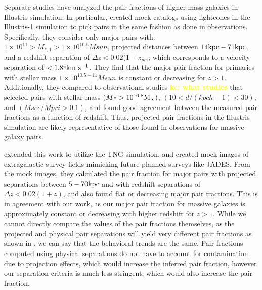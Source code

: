 \documentclass[twocolumn]{aastex631}
\newcommand{\kc}[1]{\textcolor{yellow}{\textbf{kc: #1}} }
\begin{document}
Separate studies have analyzed the pair fractions of higher mass galaxies in Illustris simulation. 
In particular, \citet{snyder2017} created mock catalogs using lightcones in the Illustris-1 simulation to pick pairs in the same fashion as done in observations. 
Specifically, they consider only major pairs with: $1\times 10^{11}>M_{*,1} >1\times 10^{10.5}Msun$, projected distances between $14\mathrm{kpc}-71\mathrm{kpc}$, and a redshift separation of $\Delta z<0.02(1+z_{pri}$, which corresponds to a velocity separation of $<1.8\time10^4\kms$. 
They find that the major pair fraction for primaries with stellar mass $1\times 10^{10.5-11}Msun$ is constant or decreasing for $z>1$. 
Additionally, they compared to observational studies \kc{what studies} that selected pairs with stellar mass $(M* > 10^{10.8}\mathrm{M}_\odot)$, $(10 <d/(kpc h-1) < 30)$, and $(Msec/Mpri > 0.1)$, and found good agreement between the measured pair fractions as a function of redshift.
Thus, projected pair fractions in the Illustris simulation are likely representative of those found in observations for massive galaxy pairs.

\citet{snyder2023} extended this work to utilize the TNG simulation, and created mock images of extragalactic survey fields mimicking future planned surveys like JADES.
From the mock images, they calculated the pair fraction for major pairs with projected separations between $5-70 \mathrm{kpc}$ and with redshift separations of $\Delta z< 0.02(1+z)$, and also found flat or decreasing major pair fractions. 
This is in agreement with our work, as our major pair fraction for massive galaxies is approximately constant or decreasing with higher redshift for $z>1$. 
While we cannot directly compare the values of the pair fractions themselves, as the projected and physical pair separations will yield very different pair fractions as shown in \citet{Besla2018}, we can say that the behavioral trends are the same. 
Pair fractions computed using physical separations do not have to account for contamination due to projection effects, which would increase the inferred pair fraction, however our separation criteria is much less stringent, which would also increase the pair fraction. 

\end{document}
